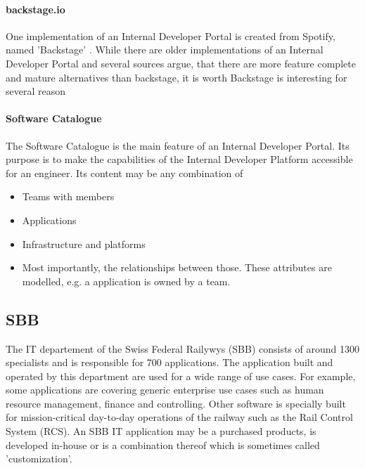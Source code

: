 \documentclass[a4paper,12pt]{article}
\begin{document}
    \paragraph{backstage.io}
    One implementation of an Internal Developer Portal is created from Spotify, named 'Backstage' \cite{backstageio}.
    While there are older implementations of an Internal Developer Portal and several sources argue, that there are more
    feature complete and mature alternatives than backstage, it is worth Backstage is interesting for several reason
    \paragraph{Software Catalogue}
    The Software Catalogue is the main feature of an Internal Developer Portal.
    Its purpose is to make the capabilities of the Internal Developer Platform accessible for an engineer.
    Its content may be any combination of
    \begin{itemize}
        \item Teams with members
        \item Applications
        \item Infrastructure and platforms
        \item Most importantly, the relationships between those. These attributes are modelled, e.g. a application is owned by a team.
    \end{itemize}



    \subsection{SBB}
    The IT departement of the Swiss Federal Railywys (SBB) consists of around 1300 specialists and is responsible for
    700 applications\cite{sbbitkennzahlen}.
    The application built and operated by this department are used for a wide range of use cases.
    For example, some applications are covering generic enterprise use cases such as human resource management, finance and controlling.
    Other software is specially built for mission-critical day-to-day operations of the railway such as the Rail Control System (RCS)\cite{sbbrcs}.
    An SBB IT application may be a purchased products, is developed in-house or is a combination thereof which is sometimes called
    'customization'.
\end{document}
